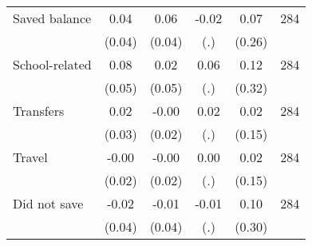 \begin{table}[h]
{\begin{threeparttable}
\begin{tabular}{l*{5}{c}}
Saved balance&     0.04&     0.06&    -0.02&     0.07&      284\\
          &   (0.04)&   (0.04)&      (.)&   (0.26)&         \\
School-related&     0.08&     0.02&     0.06&     0.12&      284\\
          &   (0.05)&   (0.05)&      (.)&   (0.32)&         \\
Transfers &     0.02&    -0.00&     0.02&     0.02&      284\\
          &   (0.03)&   (0.02)&      (.)&   (0.15)&         \\
Travel    &    -0.00&    -0.00&     0.00&     0.02&      284\\
          &   (0.02)&   (0.02)&      (.)&   (0.15)&         \\
Did not save&    -0.02&    -0.01&    -0.01&     0.10&      284\\
          &   (0.04)&   (0.04)&      (.)&   (0.30)&         \\
\bottomrule \end{tabular} \begin{tablenotes}[flushleft] \footnotesize \item  \end{tablenotes} \end{threeparttable} } \end{table}
